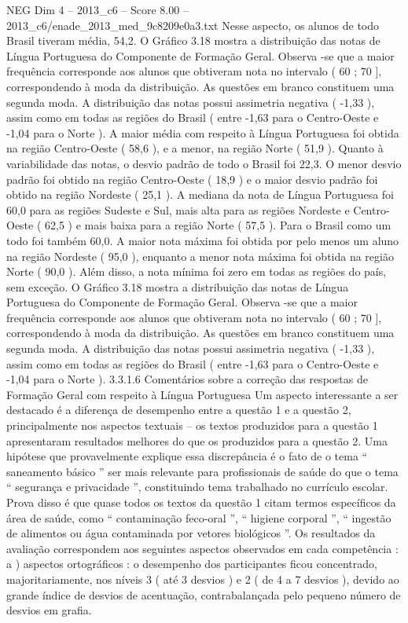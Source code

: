 \begin{textsample}{NEG Dim 4 – 2013\_c6 – Score 8.00 – 2013\_c6/enade\_2013\_med\_9c8209e0a3.txt}
Nesse aspecto, os alunos de todo Brasil tiveram média, 54,2.
O Gráfico 3.18 mostra a distribuição das notas de Língua Portuguesa do Componente de Formação Geral.
Observa -se que a maior frequência corresponde aos alunos que obtiveram nota no intervalo ( 60 ; 70 ], correspondendo à moda da distribuição.
As questões em branco constituem uma segunda moda.
A distribuição das notas possui assimetria negativa ( -1,33 ), assim como em todas as regiões do Brasil ( entre -1,63 para o Centro-Oeste e -1,04 para o Norte ).
A maior média com respeito à Língua Portuguesa foi obtida na região Centro-Oeste ( 58,6 ), e a menor, na região Norte ( 51,9 ).
Quanto à variabilidade das notas, o desvio padrão de todo o Brasil foi 22,3.
O menor desvio padrão foi obtido na região Centro-Oeste ( 18,9 ) e o maior desvio padrão foi obtido na região Nordeste ( 25,1 ).
A mediana da nota de Língua Portuguesa foi 60,0 para as regiões Sudeste e Sul, mais alta para as regiões Nordeste e Centro-Oeste ( 62,5 ) e mais baixa para a região Norte ( 57,5 ).
Para o Brasil como um todo foi também 60,0.
A maior nota máxima foi obtida por pelo menos um aluno na região Nordeste ( 95,0 ), enquanto a menor nota máxima foi obtida na região Norte ( 90,0 ).
Além disso, a nota mínima foi zero em todas as regiões do país, sem exceção.
O Gráfico 3.18 mostra a distribuição das notas de Língua Portuguesa do Componente de Formação Geral.
Observa -se que a maior frequência corresponde aos alunos que obtiveram nota no intervalo ( 60 ; 70 ], correspondendo à moda da distribuição.
As questões em branco constituem uma segunda moda.
A distribuição das notas possui assimetria negativa ( -1,33 ), assim como em todas as regiões do Brasil ( entre -1,63 para o Centro-Oeste e -1,04 para o Norte ). 3.3.1.6 Comentários sobre a correção das respostas de Formação Geral com respeito à Língua Portuguesa Um aspecto interessante a ser destacado é a diferença de desempenho entre a questão 1 e a questão 2, principalmente nos aspectos textuais – os textos produzidos para a questão 1 apresentaram resultados melhores do que os produzidos para a questão 2.
Uma hipótese que provavelmente explique essa discrepância é o fato de o tema “ saneamento básico ” ser mais relevante para profissionais de saúde do que o tema “ segurança e privacidade ”, constituindo tema trabalhado no currículo escolar.
Prova disso é que quase todos os textos da questão 1 citam termos específicos da área de saúde, como “ contaminação feco-oral ”, “ higiene corporal ”, “ ingestão de alimentos ou água contaminada por vetores biológicos ”.
Os resultados da avaliação correspondem aos seguintes aspectos observados em cada competência : a ) aspectos ortográficos : o desempenho dos participantes ficou concentrado, majoritariamente, nos níveis 3 ( até 3 desvios ) e 2 ( de 4 a 7 desvios ), devido ao grande índice de desvios de acentuação, contrabalançada pelo pequeno número de desvios em grafia.

\end{textsample}
